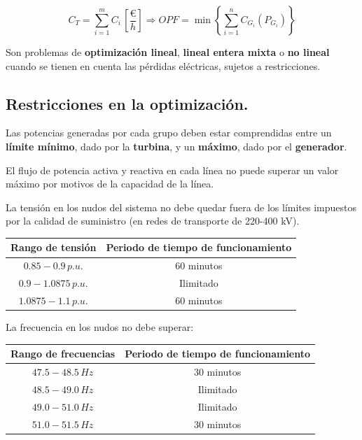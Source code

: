 			\[C_T = \sum_{i = 1}^m C_i\,\left[\dfrac{\euro}{h}\right] \Rightarrow 
			OPF = \min{ \left\{ \sum_{i = 1}^n C_{G_i} (P_{G_i}) \right\} } \]
			
			
			Son problemas de \textbf{optimización lineal}, \textbf{lineal entera mixta} o \textbf{no lineal} cuando se tienen en cuenta las pérdidas eléctricas, sujetos a restricciones. 
			
		\subsection{Restricciones en la optimización.}
			Las potencias generadas por cada grupo deben estar comprendidas entre un \textbf{límite mínimo}, dado por la \textbf{turbina}, y un \textbf{máximo}, dado por el \textbf{generador}.
			
			
			El flujo de potencia activa y reactiva en cada línea no puede superar un valor máximo por motivos de la capacidad de la línea.
			
			
			La tensión en los nudos del sistema no debe quedar fuera de los límites impuestos por la calidad de suministro (en redes de transporte de 220-400 kV).
			
			
			\begin{table}[H]
				\centering
				\begin{tabular}{cc}
					\textbf{Rango de tensión} & \textbf{Periodo de tiempo de funcionamiento}\\
					\hline
					$0.85-0.9\,p.u.$ & 60 minutos\\
					$0.9-1.0875\,p.u.$ & Ilimitado\\
					$1.0875-1.1\,p.u.$ & 60 minutos
				\end{tabular}
				\label{tab:tiemposCdt}
			\end{table}
			
			
			La frecuencia en los nudos no debe superar:
			
			\begin{table}[H]
				\centering
				\begin{tabular}{cc}
					\textbf{Rango de frecuencias} & \textbf{Periodo de tiempo de funcionamiento}\\
					\hline
					$47.5-48.5\,Hz$ & 30 minutos\\
					$48.5-49.0\,Hz$ & Ilimitado\\
					$49.0-51.0\,Hz$ & Ilimitado\\
					$51.0-51.5\,Hz$ & 30 minutos
				\end{tabular}
				\label{tab:tiemposfrecuencias}
			\end{table}			
			
